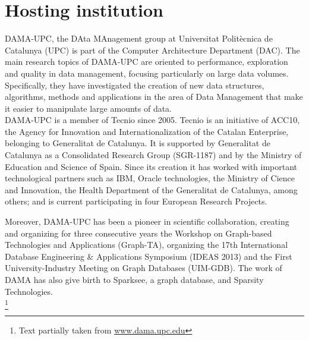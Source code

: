 \section{Hosting institution}

DAMA-UPC, the DAta MAnagement group at Universitat Polit\`ecnica de Catalunya (UPC) is part of the Computer Architecture Department (DAC). The main research topics of DAMA-UPC are oriented to performance, exploration and quality in data management, focusing particularly on large data volumes. Specifically, they have investigated the creation of new data structures, algorithms, methods and applications in the area of Data Management that make it easier to manipulate large amounts of data.\\

DAMA-UPC is a member of Tecnio since 2005. Tecnio is an initiative of ACC10, the Agency for Innovation and Internationalization of the Catalan Enterprise, belonging to Generalitat de Catalunya. It is supported by Generalitat de Catalunya as a Consolidated Research Group (SGR-1187) and by the Ministry of Education and Science of Spain. Since its creation it has worked with important technological partners such as IBM, Oracle technologies, the Ministry of Cience and Innovation, the Health Department of the Generalitat de Catalunya, among others; and is current participating in four European Research Projects. 

Moreover, DAMA-UPC has been a pioneer in scientific collaboration, creating and organizing for three consecutive years the Workshop on Graph-based Technologies and Applications (Graph-TA), organizing the 17th International Database Engineering \& Applications Symposium (IDEAS 2013) and the First University-Industry Meeting on Graph Databases (UIM-GDB). The work of DAMA has also give birth to Sparksee, a graph database, and Sparsity Technologies.\\

\footnote{Text partially taken from \url{www.dama.upc.edu}}
